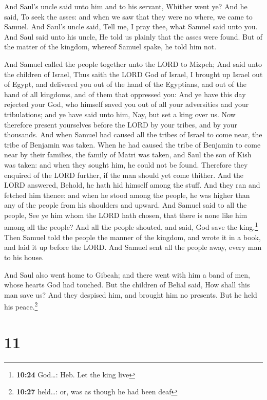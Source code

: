  And Saul's uncle said unto him and to his servant,
Whither went ye? And he said, To seek the asses: and when we saw that
they were no where, we came to Samuel.  And Saul's uncle
said, Tell me, I pray thee, what Samuel said unto you. 
And Saul said unto his uncle, He told us plainly that the asses were
found. But of the matter of the kingdom, whereof Samuel spake, he told
him not.

 And Samuel called the people together unto the LORD to
Mizpeh;  And said unto the children of Israel, Thus saith
the LORD God of Israel, I brought up Israel out of Egypt, and delivered
you out of the hand of the Egyptians, and out of the hand of all
kingdoms, and of them that oppressed you:  And ye have
this day rejected your God, who himself saved you out of all your
adversities and your tribulations; and ye have said unto him, Nay, but
set a king over us. Now therefore present yourselves before the LORD by
your tribes, and by your thousands.  And when Samuel had
caused all the tribes of Israel to come near, the tribe of Benjamin was
taken.  When he had caused the tribe of Benjamin to come
near by their families, the family of Matri was taken, and Saul the son
of Kish was taken: and when they sought him, he could not be found.
 Therefore they enquired of the LORD further, if the man
should yet come thither. And the LORD answered, Behold, he hath hid
himself among the stuff.  And they ran and fetched him
thence: and when he stood among the people, he was higher than any of
the people from his shoulders and upward.  And Samuel
said to all the people, See ye him whom the LORD hath chosen, that there
is none like him among all the people? And all the people shouted, and
said, God save the king.\footnote{\textbf{10:24} God\ldots: Heb. Let the
  king live}  Then Samuel told the people the manner of
the kingdom, and wrote it in a book, and laid it up before the LORD. And
Samuel sent all the people away, every man to his house.

 And Saul also went home to Gibeah; and there went with
him a band of men, whose hearts God had touched.  But the
children of Belial said, How shall this man save us? And they despised
him, and brought him no presents. But he held his peace.\footnote{\textbf{10:27}
  held\ldots: or, was as though he had been deaf}

\hypertarget{section-10}{%
\section{11}\label{section-10}}

